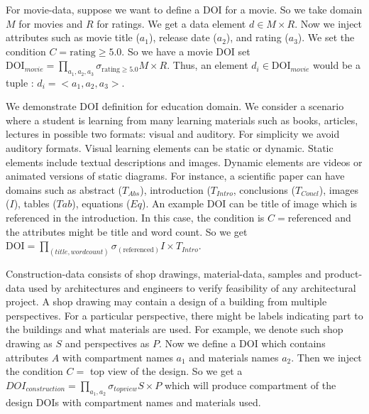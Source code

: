 For movie-data, suppose we want to define a DOI for a movie. So we take domain $M$ for movies and $R$ for ratings. We get a data element $d \in M \times R$. Now we inject attributes such as movie title ($a_1$), release date ($a_2$), and rating ($a_3$). We set the condition $C= \text{rating} \geq 5.0$. So we have a movie DOI set $\text{DOI}_{movie} = \prod_{a_1,a_2,a_3}\sigma_{\text{rating} \geq 5.0} M \times R$. Thus, an element $d_i \in \text{DOI}_{movie}$ would be a tuple : $d_i =< a_1, a_2, a_3>$. 

We demonstrate DOI definition for education domain. We consider a scenario where a student is learning from many learning materials such as books, articles, lectures in possible two formats: visual and auditory. For simplicity we avoid auditory formats. Visual learning elements can be static or dynamic. Static elements include textual descriptions and images. Dynamic elements are videos or animated versions of static diagrams. For instance, a scientific paper can have domains such as abstract ($T_{Abs}$), introduction ($T_{Intro}$, conclusions ($T_{Concl}$), images ($I$), tables ($Tab$), equations ($Eq$). An example DOI can be title of image which is referenced in the introduction. In this case, the condition is $C=$referenced and the attributes might be title and word count. So we get $\text{DOI} = \prod_{(title, wordcount)} \sigma_{(\text{referenced})} I \times T_{Intro}$. 

Construction-data consists of shop drawings, material-data, samples and product-data used by architectures and engineers to verify feasibility of any architectural project. A shop drawing may contain a design of a building from multiple perspectives. For a particular perspective, there might be labels indicating part to the buildings and what materials are used. For example, we denote such shop drawing as $S$ and perspectives as $P$. Now we define a DOI which contains attributes $A$ with compartment names $a_1$ and materials names $a_2$. Then we inject the condition $C=$ top view of the design. So we get a $DOI_{construction} = \prod_{a_1,a_2} \sigma_{topview} S \times P$ which will produce compartment of the design DOIs with compartment names and materials used. 

